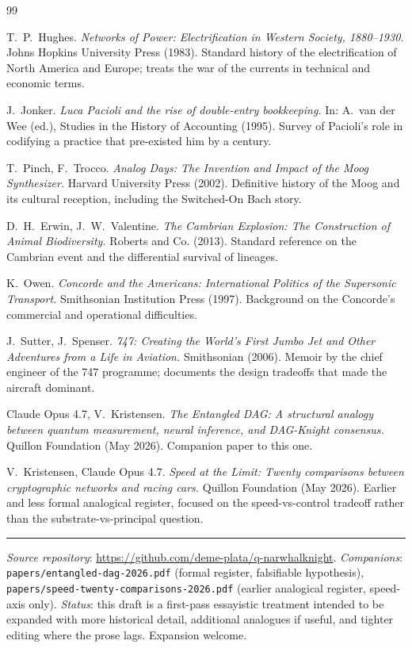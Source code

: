 \documentclass[11pt,a4paper]{article}
\begin{document}
\begin{thebibliography}{99}

 T.\ P.\ Hughes. \emph{Networks of Power:
Electrification in Western Society, 1880--1930.} Johns Hopkins
University Press (1983). Standard history of the electrification of
North America and Europe; treats the war of the currents in technical
and economic terms.

 J.\ Jonker. \emph{Luca Pacioli and the rise of
double-entry bookkeeping.} In: A.\ van der Wee (ed.), Studies in the
History of Accounting (1995). Survey of Pacioli's role in codifying a
practice that pre-existed him by a century.

 T.\ Pinch, F.\ Trocco. \emph{Analog Days: The
Invention and Impact of the Moog Synthesizer.} Harvard University Press
(2002). Definitive history of the Moog and its cultural reception,
including the Switched-On Bach story.

 D.\ H.\ Erwin, J.\ W.\ Valentine. \emph{The Cambrian
Explosion: The Construction of Animal Biodiversity.} Roberts and Co.
(2013). Standard reference on the Cambrian event and the differential
survival of lineages.

 K.\ Owen. \emph{Concorde and the Americans:
International Politics of the Supersonic Transport.} Smithsonian
Institution Press (1997). Background on the Concorde's commercial and
operational difficulties.

 J.\ Sutter, J.\ Spenser. \emph{747: Creating the
World's First Jumbo Jet and Other Adventures from a Life in Aviation.}
Smithsonian (2006). Memoir by the chief engineer of the 747 programme;
documents the design tradeoffs that made the aircraft dominant.

 Claude Opus 4.7, V.\ Kristensen. \emph{The
Entangled DAG: A structural analogy between quantum measurement, neural
inference, and DAG-Knight consensus.} Quillon Foundation (May 2026).
Companion paper to this one.

 V.\ Kristensen, Claude Opus 4.7. \emph{Speed at
the Limit: Twenty comparisons between cryptographic networks and racing
cars.} Quillon Foundation (May 2026). Earlier and less formal analogical
register, focused on the speed-vs-control tradeoff rather than the
substrate-vs-principal question.

\end{thebibliography}

\bigskip
\hrule
\medskip
\small\textit{Source repository}: \url{https://github.com/deme-plata/q-narwhalknight}.
\textit{Companions}: \texttt{papers/entangled-dag-2026.pdf} (formal
register, falsifiable hypothesis), \texttt{papers/speed-twenty-comparisons-2026.pdf}
(earlier analogical register, speed-axis only).
\textit{Status}: this draft is a first-pass essayistic treatment intended
to be expanded with more historical detail, additional analogues if
useful, and tighter editing where the prose lags. Expansion welcome.
\end{document}
